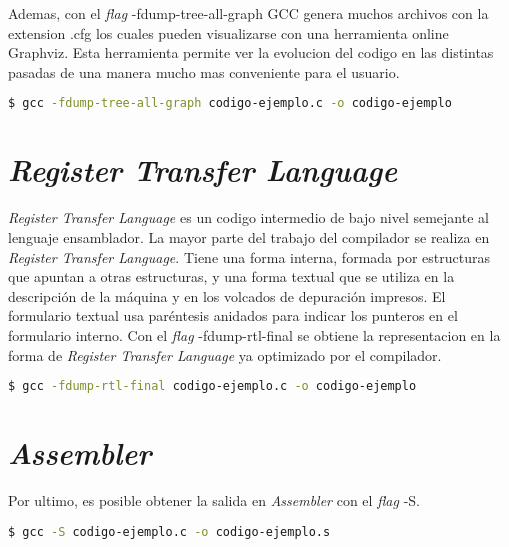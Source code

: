 Ademas, con el \emph{flag} -fdump-tree-all-graph GCC genera muchos archivos con la extension .cfg 
los cuales pueden visualizarse con una herramienta online Graphviz. Esta herramienta permite 
ver la evolucion del codigo en las distintas pasadas de una manera mucho mas conveniente 
para el usuario. 

\begin{lstlisting}[label=comandoC, caption= Comando de compilación del archivo codigo-ejemplo.c \cite{repositorio} para GCC., language=bash]
    $ gcc -fdump-tree-all-graph codigo-ejemplo.c -o codigo-ejemplo  \end{lstlisting}


\section{\emph{Register Transfer Language}}

\emph{Register Transfer Language} es un codigo intermedio de bajo nivel semejante al lenguaje ensamblador.
La mayor parte del trabajo del compilador se realiza en \emph{Register Transfer Language}. Tiene una forma interna, 
formada por estructuras que apuntan a otras estructuras, y una forma textual 
que se utiliza en la descripción de la máquina y en los volcados de depuración 
impresos. El formulario textual usa paréntesis anidados para indicar los punteros en el formulario interno.
Con el \emph{flag} -fdump-rtl-final se obtiene la representacion en la forma de \emph{Register Transfer Language} ya optimizado por el compilador.

\begin{lstlisting}[label=comandoC, caption= Comando de compilación del archivo codigo-ejemplo.c \cite{repositorio} para GCC., language=bash]
    $ gcc -fdump-rtl-final codigo-ejemplo.c -o codigo-ejemplo  \end{lstlisting}

\section{\emph{Assembler}}
Por ultimo, es posible obtener la salida en \emph{Assembler} con el \emph{flag} -S.

\begin{lstlisting}[label=comandoC, caption= Comando de compilación del archivo codigo-ejemplo.c \cite{repositorio} para GCC., language=bash]
    $ gcc -S codigo-ejemplo.c -o codigo-ejemplo.s  \end{lstlisting}


